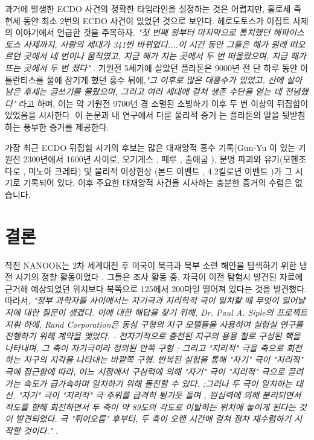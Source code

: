 \documentclass[10pt,twocolumn,letterpaper]{article}
\begin{document}
과거에 발생한  ECDO 사건의 정확한 타임라인을 설정하는 것은 어렵지만, 홀로세 즉 현세 동안 최소 2번의 ECDO 사건이 있었던 것으로 보인다. 헤로도토스가 이집트 사제의 이야기에서 언급한 것을 주목하자. \textit{"첫 번째 왕부터 마지막으로 통치했던 헤파이스토스 사제까지, 사람의 세대가 341번 바뀌었다....이 시간 동안 그들은 해가 원래 떠오르던 곳에서 네 번이나 움직였고, 지금 해가 지는 곳에서 두 번 떠올랐으며, 지금 해가 뜨는 곳에서 두 번 졌다"} \cite{32}. 기원전 5세기에 살았던 플라톤은 9000년 전 단 하루 동안 아틀란티스를 물에 잠기게 했던 홍수 뒤에,\textit{"그 이후로 많은 대홍수가 있었고, 산에 살아남은 후세는 글쓰기를 몰랐으며, 그리고  여러 세대에 걸쳐 생존 수단을 얻는 데 전념했다"} \cite{112}라고 하며, 이는 약 기원전 9700년 경 소멸된 소빙하기 이후 두 번 이상의 뒤집힘이 있었음을 시사한다. 이 논문과 내 연구에서 다룬 물리적 증거 \cite{2}는 플라톤의 말을 뒷받침하는 풍부한 증거를 제공한다.

가장 최근 ECDO 뒤집힘 시기의 후보는  많은 대재앙적 홍수 기록(Gun-Yu \cite{113,114,115}이 있는 기원전 2300년에서 1600년 사이로, 오기게스 \cite{116,117}, 페루 \cite{118,119}, 출애굽 \cite{120}), 문명 파괴와 유기(모헨조다로 \cite{121}, 미노아 크레타\cite{100,101}) 및 물리적 이상현상 (본드 이벤트 \cite{122}, 4.2킬로년 이벤트 \cite{90})가 그 시기로 기록되어 있다. 이후 주요한 대재앙적 사건을 시사하는 충분한 증거의 수렴은 없습니다.

\section{결론}
작전 NANOOK는 2차 세계대전 후 미국이 북극과 북부 소련 해안을 탐색하기 위한 냉전 시기의 정찰 활동이었다 \cite{137}. 그들은 조사 활동 중, 자극이 이전 탐험시 발견된 자료에 근거해 예상되었던 위치보다 북쪽으로 125에서 200마일 떨어져 있다는 것을 발견했다. 따라서, \textit{"정부 과학자들 사이에서는 자기극과  지리학적 극이 일치할 때 무엇이 일어날지에 대한 질문이 생겼다. 이에 대한 해답을 찾기 위해, Dr. Paul A. Siple의 프로젝트 지휘 하에, Rand Corporation은 동심 구형의 지구 모델들을 사용하여  실험실 연구를 진행하기 위해 계약을 맺었다. - 전자기적으로 충전된 지구의 용융 철로 구성된 핵을 나타내며, 그 축이 자기극이라 정의된 안쪽 구형 ; 그리고 "지리적" 극을 축으로 회전하는 지구의 지각을 나타내는 바깥쪽 구형. 반복된 실험을 통해 "자기" 극이 "지리적" 극에 접근함에 따라, 어느 시점에서 구심력에 의해  "자기" 극이 "지리적" 극으로 끌려가는 속도가 급가속하며 일치하기 위해 돌진할 수 있다. ;그러나 두 극이 일치하는 대신, "자기" 극이 "지리적" 극 주위를 급격히 튕기듯 돌며 , 원심력에 의해 분리되면서 적도를 향해 회전하면서 두 축이 약 89도의 각도로 이탈하는 위치에 놓이게 된다는 것이 발견되었다. 극 "튀어오름" 후부터, 두 축이 오랜 시간에 걸쳐 점차 재수렴하기 시작할 것이다."} \cite{138,139}.
\end{document}
